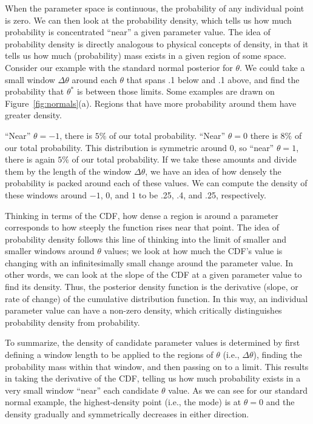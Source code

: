 \documentclass[9pt,twocolumn,twoside]{cidlab-draft}\templatetype{cidlab-invited}
\begin{document}
When the parameter space is continuous, the probability of any individual point is zero. We can then look at the probability density, which tells us how much probability is concentrated ``near'' a given parameter value. The idea of probability density is directly analogous to physical concepts of density, in that it tells us how much (probability) mass exists in a given region of some space. Consider our example with the standard normal posterior for $\theta$. We could take a small window $\Delta \theta$ around each $\theta$ that spans .1 below and .1 above, and find the probability that $\theta^*$ is between those limits. Some examples are drawn on Figure~\ref{fig:normals}(a).
Regions that have more probability around them have greater density.

``Near'' $\theta=-1$, there is $5\%$ of our total probability. ``Near'' $\theta=0$ there is $8\%$ of our total probability. This distribution is symmetric around 0, so ``near'' $\theta=1$, there is again $5\%$ of our total probability. If we take these amounts and divide them by the length of the window $\Delta \theta$, we have an idea of how densely the probability is packed around each of these values. We can compute the density of these windows around  $-1$, 0, and $1$ to be .25, .4, and .25, respectively. 

Thinking in terms of the CDF, how dense a region is around a parameter corresponds to how steeply the function rises near that point. The idea of probability density follows this line of thinking into the limit of smaller and smaller windows around $\theta$ values; we look at how much the CDF's value is changing with an infinitesimally small change around the parameter value. In other words, we can look at the slope of the CDF at a given parameter value to find its density. Thus, the posterior density function is the derivative (slope, or rate of change) of the cumulative distribution function. In this way, an individual parameter value can have a non-zero density, which critically distinguishes probability density from probability.

To summarize, the density of candidate parameter values is determined by first defining a window length to be applied to the regions of $\theta$ (i.e., $\Delta\theta$), finding the probability mass within that window, and then passing on to a limit. This results in taking the derivative of the CDF, telling us how much probability exists in a very small window ``near'' each candidate $\theta$ value. As we can see for our standard normal example, the highest-density point (i.e., the mode) is at $\theta=0$ and the density gradually and symmetrically decreases in either direction.
\end{document}
